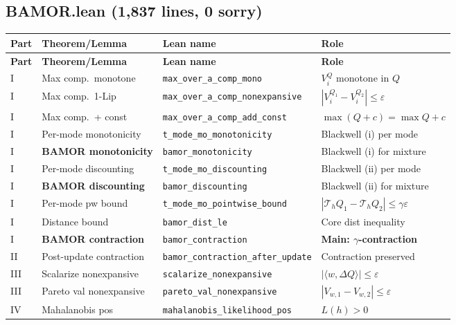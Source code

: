 \subsection{BAMOR.lean (1,837 lines, \textbf{0 sorry})}
\begingroup
\scriptsize
\setlength{\tabcolsep}{3pt}
\begin{longtable}{@{}p{}p{}p{}p{}@{}}
\toprule
\textbf{Part} & \textbf{Theorem/Lemma} & \textbf{Lean name} & \textbf{Role} \\
\midrule
\endfirsthead
\toprule
\textbf{Part} & \textbf{Theorem/Lemma} & \textbf{Lean name} & \textbf{Role} \\
\midrule
\endhead
\bottomrule
\endfoot
I & Max comp.\ monotone & \texttt{max\_over\_a\_comp\_mono} & $V_i^Q$ monotone in $Q$ \\
I & Max comp.\ 1-Lip & \texttt{max\_over\_a\_comp\_nonexpansive} & $|V_i^{Q_1} - V_i^{Q_2}| \le \varepsilon$ \\
I & Max comp.\ + const & \texttt{max\_over\_a\_comp\_add\_const} & $\max(Q+c) = \max Q + c$ \\
I & Per-mode monotonicity & \texttt{t\_mode\_mo\_monotonicity} & Blackwell (i) per mode \\
I & \textbf{BAMOR monotonicity} & \texttt{bamor\_monotonicity} & Blackwell (i) for mixture \\
I & Per-mode discounting & \texttt{t\_mode\_mo\_discounting} & Blackwell (ii) per mode \\
I & \textbf{BAMOR discounting} & \texttt{bamor\_discounting} & Blackwell (ii) for mixture \\
I & Per-mode pw bound & \texttt{t\_mode\_mo\_pointwise\_bound} & $|\mathcal{T}_h Q_1 - \mathcal{T}_h Q_2| \le \gamma\varepsilon$ \\
I & Distance bound & \texttt{bamor\_dist\_le} & Core dist inequality \\
I & \textbf{BAMOR contraction} & \texttt{bamor\_contraction} & \textbf{Main: $\gamma$-contraction} \\
\midrule
II & Post-update contraction & \texttt{bamor\_contraction\_after\_update} & Contraction preserved \\
\midrule
III & Scalarize nonexpansive & \texttt{scalarize\_nonexpansive} & $|\langle w, \Delta Q \rangle| \le \varepsilon$ \\
III & Pareto val nonexpansive & \texttt{pareto\_val\_nonexpansive} & $|V_{w,1} - V_{w,2}| \le \varepsilon$ \\
\midrule
IV & Mahalanobis pos & \texttt{mahalanobis\_likelihood\_pos} & $L(h) > 0$ \\

\end{longtable}
